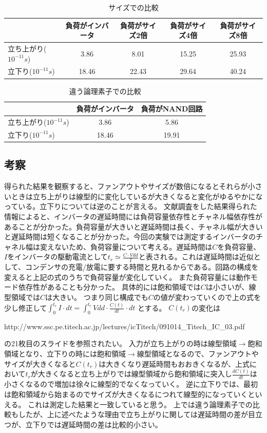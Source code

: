 \documentclass{jsarticle}
\begin{document}
\begin{table}[H]
    \caption{サイズでの比較}
    \centering
    \begin{tabular}{|l|c|c|c|c|} \hline
        &負荷がインバータ&負荷がサイズ2倍&負荷がサイズ4倍&負荷がサイズ8倍\\ \hline \hline
        立ち上がり($10^{-11} s$)&3.86&8.01&15.25&25.93\\
        立下り($10^{-11} s$)&18.46&22.43&29.64&40.24\\
        \hline
    \end{tabular}
\end{table}

\begin{table}[H]
    \caption{違う論理素子での比較}
    \centering
    \begin{tabular}{|l|c|c|} \hline
        &負荷がインバータ&負荷がNAND回路\\ \hline \hline
        立ち上がり($10^{-11} s$)&3.86&5.86\\ 
        立下り($10^{-11} s$)&18.46&19.91\\
        \hline
    \end{tabular}
\end{table}

\subsection{考察}
得られた結果を観察すると、ファンアウトやサイズが数倍になるとそれらが小さいときは立ち上がりは線型的に変化しているが大きくなると変化がゆるやかになっている。立下りについては逆のことが言える。
文献調査をした結果得られた情報によると、インバータの遅延時間には負荷容量依存性とチャネル幅依存性があることが分かった。負荷容量が大きいと遅延時間は長く、チャネル幅が大きいと遅延時間は短くなることが分かった。今回の実験では測定するインバータのチャネル幅は変えないため、負荷容量について考える。遅延時間は$C$を負荷容量、$I$をインバータの駆動電流として$t_{r} \simeq \frac{C \cdot Vdd}{I}$と表される。これは遅延時間は近似として、コンデンサの充電/放電に要する時間と見れるからである。回路の構成を変えると上記の式のうちで負荷容量が変化していく。
また負荷容量には動作モード依存性があることも分かった。
具体的には飽和領域では$C$は小さいが、線型領域では$C$は大きい。
つまり同じ構成でも$C$の値が変わっていくので上の式を少し修正して$\int_0^{t_{r}} I \cdot dt = \int_0^{t_{r}} Vdd \cdot \frac{C(t)}{dt} \cdot dt$ とする。
$C(t_r)$の変化は
\begin{url}
    {http://www.ssc.pe.titech.ac.jp/lectures/icTitech/091014_Titech_IC_03.pdf}
\end{url}の21枚目のスライドを参照されたい。
入力が立ち上がりの時は線型領域$\rightarrow$飽和領域となり、立下りの時には飽和領域$\rightarrow$線型領域となるので、ファンアウトやサイズが大きくなると$C(t_r)$は大きくなり遅延時間もおおきくなるが、上式において$t_r$が大きくなると立ち上がりでは線型領域から飽和領域に突入し$\frac{dC(t)}{dt}$は小さくなるので増加は徐々に線型的でなくなっていく。
逆に立下りでは、最初は飽和領域から始まるのでサイズが大きくなるにつれて線型的になっていくといえる。
これは測定した結果と一致していると思う。
上では違う論理素子での比較もしたが、上に述べたような理由で立ち上がりに関しては遅延時間の差が目立つが、立下りでは遅延時間の差は比較的小さい。
\end{document}
